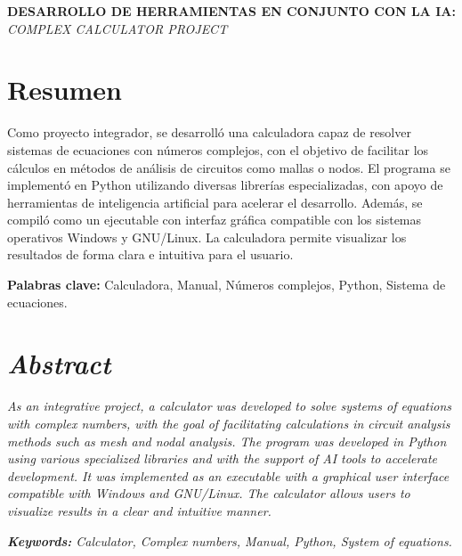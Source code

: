 \documentclass[12pt,a4paper]{article}
\begin{document}
\begingroup
{}
\begin{center}
  {\fontsize{16}{18}\bfseries \MakeUppercase{Desarrollo de Herramientas en conjunto con la IA: }}\\[0.5cm]
  {\fontsize{14}{16}\itshape \MakeUppercase{Complex calculator Project}}\\[1cm]



\end{center}
\endgroup

\section*{Resumen}

Como proyecto integrador, se desarrolló una calculadora capaz de resolver sistemas de ecuaciones con números complejos, con el objetivo de facilitar los cálculos en métodos de análisis de circuitos como mallas o nodos.  
El programa se implementó en Python utilizando diversas librerías especializadas, con apoyo de herramientas de inteligencia artificial para acelerar el desarrollo. Además, se compiló como un ejecutable con interfaz gráfica compatible con los sistemas operativos Windows y GNU/Linux. La calculadora permite visualizar los resultados de forma clara e intuitiva para el usuario.

\noindent \textbf{Palabras clave:} Calculadora, Manual, Números complejos, Python, Sistema de ecuaciones.

\section*{\itshape Abstract}
\textit{
As an integrative project, a calculator was developed to solve systems of equations with complex numbers, with the goal of facilitating calculations in circuit analysis methods such as mesh and nodal analysis. The program was developed in Python using various specialized libraries and with the support of AI tools to accelerate development. It was implemented as an executable with a graphical user interface compatible with Windows and GNU/Linux. The calculator allows users to visualize results in a clear and intuitive manner.
}

\noindent \textit{\textbf{Keywords:} Calculator, Complex numbers, Manual, Python, System of equations.}
\end{document}
